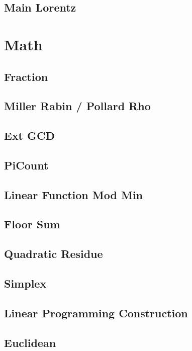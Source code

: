 \subsection{Main Lorentz}


\section{Math}
\subsection{Fraction}

\subsection{Miller Rabin / Pollard Rho}

\subsection{Ext GCD}

\subsection{PiCount}

\subsection{Linear Function Mod Min}

\subsection{Floor Sum}

\subsection{Quadratic Residue}

\subsection{Simplex}

\subsection{Linear Programming Construction}

\subsection{Euclidean}

